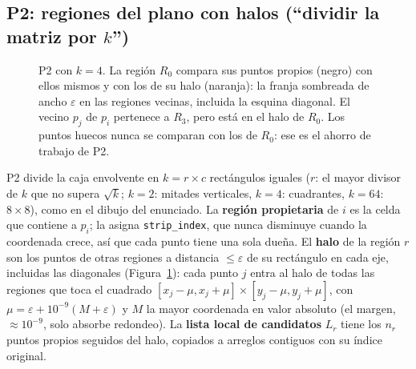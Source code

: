 \documentclass[11pt,letterpaper]{article}
\newcommand{\code}[1]{\texttt{#1}}
\begin{document}
\subsection{P2: regiones del plano con halos (``dividir la matriz por \texorpdfstring{$k$}{k}'')}\label{sec:p2}
\begin{figure}[t]
\begin{minipage}[c]{0.47\textwidth}\centering
{}
\end{minipage}\hfill
\begin{minipage}[c]{0.5\textwidth}
\caption{P2 con $k=4$. La región $R_0$ compara sus puntos propios (negro) con ellos mismos y con los de su halo
(naranja): la franja sombreada de ancho $\varepsilon$ en las regiones vecinas, incluida la esquina diagonal. El
vecino $p_j$ de $p_i$ pertenece a $R_3$, pero está en el halo de $R_0$. Los puntos huecos nunca se comparan con los
de $R_0$: ese es el ahorro de trabajo de P2.}
\label{fig:halo}
\end{minipage}
\end{figure}

P2 divide la caja envolvente en $k=r\times c$ rectángulos iguales ($r$: el mayor divisor de $k$ que no supera
$\sqrt k$; $k=2$: mitades verticales, $k=4$: cuadrantes, $k=64$: $8\times8$), como en el dibujo del enunciado. La
\textbf{región propietaria} de $i$ es la celda que contiene a $p_i$; la asigna \code{strip\_index}, que nunca
disminuye cuando la coordenada crece, así que cada punto tiene una sola dueña. El \textbf{halo} de la región $r$ son
los puntos de otras regiones a distancia $\le\varepsilon$ de su rectángulo en cada eje, incluidas las diagonales
(Figura~\ref{fig:halo}): cada punto $j$ entra al halo de todas las regiones que toca el cuadrado
$[x_j-\mu,x_j+\mu]\times[y_j-\mu,y_j+\mu]$, con $\mu=\varepsilon+10^{-9}(M+\varepsilon)$ y $M$ la mayor coordenada
en valor absoluto (el margen, $\approx10^{-9}$, solo absorbe redondeo). La \textbf{lista local de candidatos} $L_r$
tiene los $n_r$ puntos propios seguidos del halo, copiados a arreglos contiguos con su índice original.
\end{document}
